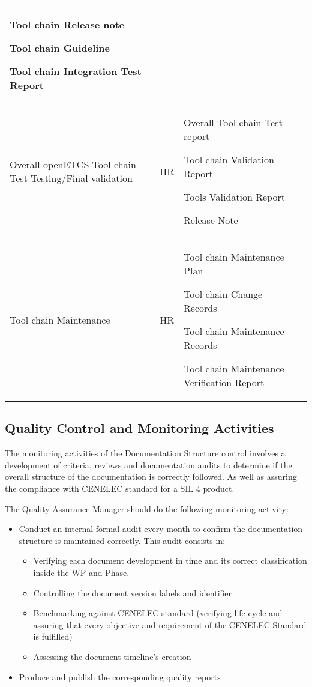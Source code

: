 \documentclass{template/openetcs_article}
\begin{document}
\begin{center}
\begin{longtable}{|m{2cm}|m{1.5cm}|m{8cm}|m{3cm}|}
Tool chain Release note

Tool chain Guideline

Tool chain Integration Test Report
&
\\\hline
Overall openETCS Tool chain Test Testing/Final validation &
\centering \gls{HR} &
Overall Tool chain Test report

Tool chain Validation Report

Tools Validation Report
 
Release Note &
\\\hline
Tool chain Maintenance &
\centering \gls{HR} &
Tool chain Maintenance Plan

Tool chain Change Records

Tool chain Maintenance Records

Tool chain Maintenance Verification Report
&
\\\hline
\end{longtable}
\end{center}


\subsection{Quality Control and Monitoring Activities}
The monitoring activities of the Documentation Structure control involves a development of  criteria, reviews and documentation audits to determine if the overall structure of the documentation is correctly followed. As well as assuring the compliance with CENELEC standard for a SIL 4 product.

The Quality Assurance Manager should do the following monitoring activity:
\begin{itemize}
\item Conduct an internal formal audit every month to confirm the documentation structure is maintained correctly. This audit consists in:
\begin{itemize}
\item Verifying each document development in time and its correct classification inside the WP and Phase.
\item Controlling the document version labels and identifier
\item Benchmarking against CENELEC standard (verifying life cycle and assuring that every objective and requirement of the CENELEC Standard is fulfilled)
\item Assessing the document timeline’s creation
\end{itemize}
\item Produce and publish the corresponding quality reports
\end{itemize}
\end{document}
